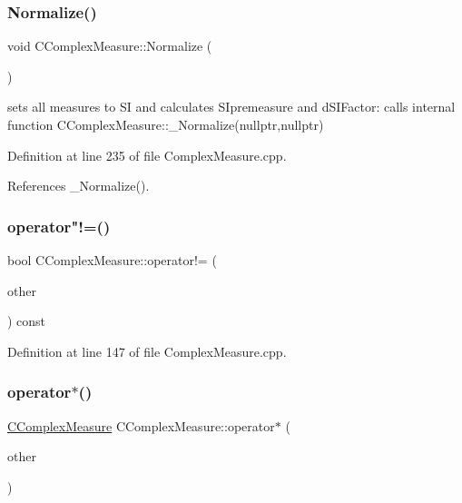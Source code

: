\subsubsection{\texorpdfstring{Normalize()}{Normalize()}}
{\footnotesize\ttfamily void C\+Complex\+Measure\+::\+Normalize (\begin{DoxyParamCaption}{ }\end{DoxyParamCaption})}



sets all measures to SI and calculates S\+Ipremeasure and d\+S\+I\+Factor\+: calls internal function C\+Complex\+Measure\+::\+\_\+\+Normalize(nullptr,nullptr) 



Definition at line 235 of file Complex\+Measure.\+cpp.



References \+\_\+\+Normalize().

\mbox{\label{classCComplexMeasure_ab5e7581c34b128a8b24a7237094a4fe4}} 
\subsubsection{\texorpdfstring{operator"!=()}{operator!=()}}
{\footnotesize\ttfamily bool C\+Complex\+Measure\+::operator!= (\begin{DoxyParamCaption}\item[{const \hyperlink{classCComplexMeasure}{C\+Complex\+Measure} \&}]{other }\end{DoxyParamCaption}) const}



Definition at line 147 of file Complex\+Measure.\+cpp.

\mbox{\label{classCComplexMeasure_afb04c59abf1f8ed44fe13d56df5d322c}} 
\subsubsection{\texorpdfstring{operator$\ast$()}{operator*()}}
{\footnotesize\ttfamily \hyperlink{classCComplexMeasure}{C\+Complex\+Measure} C\+Complex\+Measure\+::operator$\ast$ (\begin{DoxyParamCaption}\item[{const \hyperlink{classCComplexMeasure}{C\+Complex\+Measure} \&}]{other }\end{DoxyParamCaption})}



